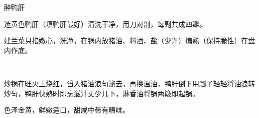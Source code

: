 \begin{recipe}{醉鸭肝}

\ingredients


\preparation

\step 选黄色鸭肝（填鸭肝最好）清洗干净，用刀对剖，每副共成四瓣。

\step 建兰菜只掐嫩心，洗净，在锅内放猪油、料酒、盐（少许）煸熟（保持脆性）在盘
内作底。

\step 𫃑糟浮子、甜酱、酱油、胡椒面、白糖、味精、水亘粉及清汤少许兑成滋汁。

\step 炒锅在旺火上烧红，舀入猪油浪匀泌去，再换温油，鸭肝倒下用瓢子轻轻将油浪转
炒匀，鸭肝快熟时即烹滋汁丈少几下，淋香油将锅两簸即起锅。

\features

色泽金黄，鲜嫩适口，甜咸中带有糟味。

\end{recipe}

